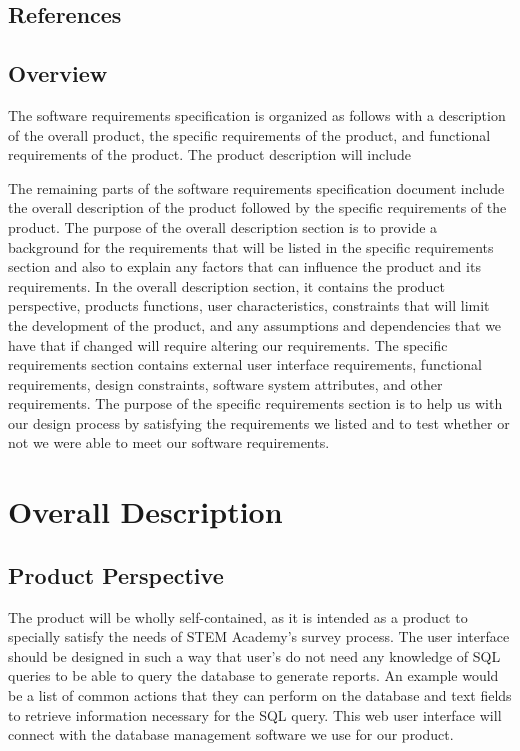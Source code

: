 \documentclass[letterpaper,10pt,titlepage, draftclsnofoot,onecolumn]{IEEEtran}
\begin{document}
\subsection{References}
\subsection{Overview}
The software requirements specification is organized as follows with a description of the overall product, the specific requirements of the
product, and functional requirements of the product. The product description will include %

The remaining parts of the software requirements specification document include the overall description of the product followed by the specific requirements of the product.
 The purpose of the overall description section is to provide a background for the requirements that will be listed in the specific requirements section and also to explain any factors that can influence the product and its requirements. 
 In the overall description section, it contains the product perspective, products functions, user characteristics, constraints that will limit the development of the product, and any assumptions and dependencies that we have that if changed will require altering our requirements. 
The specific requirements section contains external user interface requirements, functional requirements, design constraints, software system attributes, and other requirements. 
The purpose of the specific requirements section is to help us with our design process by satisfying the requirements we listed and to test whether or not we were able to meet our software requirements.  %
\section{Overall Description}

\subsection{Product Perspective}
The product will be wholly self-contained, as it is intended as a product to specially satisfy the needs of STEM Academy's survey
process. The user interface should be designed in such a way that user's do not need any knowledge of SQL queries to be able
to query the database to generate reports. An example would be a list of common actions that they can perform on the database
and text fields to retrieve information necessary for the SQL query. This web user interface will connect with the database management
software we use for our product.
\end{document}
